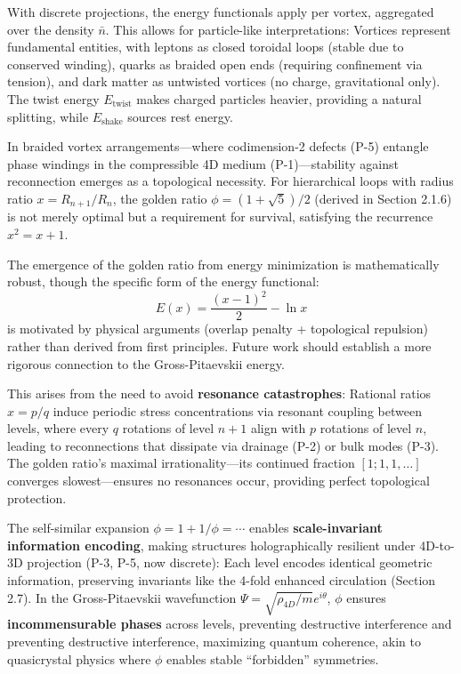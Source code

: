 With discrete projections, the energy functionals apply per vortex, aggregated over the density $\bar{n}$. This allows for particle-like interpretations: Vortices represent fundamental entities, with leptons as closed toroidal loops (stable due to conserved winding), quarks as braided open ends (requiring confinement via tension), and dark matter as untwisted vortices (no charge, gravitational only). The twist energy $E_{\text{twist}}$ makes charged particles heavier, providing a natural splitting, while $E_{\text{shake}}$ sources rest energy.

In braided vortex arrangements---where codimension-2 defects (P-5) entangle phase windings in the compressible 4D medium (P-1)---stability against reconnection emerges as a topological necessity. For hierarchical loops with radius ratio $x = R_{n+1}/R_n$, the golden ratio $\phi = (1 + \sqrt{5})/2$ (derived in Section 2.1.6) is not merely optimal but a requirement for survival, satisfying the recurrence $x^2 = x + 1$.

The emergence of the golden ratio from energy minimization is mathematically robust, though the specific form of the energy functional:
\[
E(x) = \frac{(x-1)^2}{2} - \ln x
\]
is motivated by physical arguments (overlap penalty + topological repulsion) rather than derived from first principles. Future work should establish a more rigorous connection to the Gross-Pitaevskii energy.

This arises from the need to avoid \textbf{resonance catastrophes}: Rational ratios $x = p/q$ induce periodic stress concentrations via resonant coupling between levels, where every $q$ rotations of level $n+1$ align with $p$ rotations of level $n$, leading to reconnections that dissipate via drainage (P-2) or bulk modes (P-3). The golden ratio's maximal irrationality---its continued fraction $[1; 1, 1, \ldots]$ converges slowest---ensures no resonances occur, providing perfect topological protection.

The self-similar expansion $\phi = 1 + 1/\phi = \cdots$ enables \textbf{scale-invariant information encoding}, making structures holographically resilient under 4D-to-3D projection (P-3, P-5, now discrete): Each level encodes identical geometric information, preserving invariants like the 4-fold enhanced circulation (Section 2.7). In the Gross-Pitaevskii wavefunction $\Psi = \sqrt{\rho_{4D}/m} e^{i \theta}$, $\phi$ ensures \textbf{incommensurable phases} across levels, preventing destructive interference and preventing destructive interference, maximizing quantum coherence, akin to quasicrystal physics where $\phi$ enables stable ``forbidden'' symmetries.

